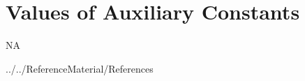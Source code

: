 \documentclass[12pt]{article}
\begin{document}
\section{Values of Auxiliary Constants}
NA 

\newpage

 {../../ReferenceMaterial/References}

\newpage
\end{document}
